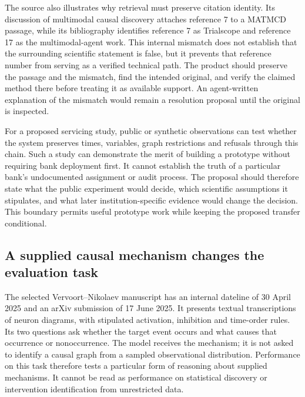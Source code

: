 The source also illustrates why retrieval must preserve citation identity.
Its discussion of multimodal causal discovery attaches reference 7 to a
MATMCD passage, while its bibliography identifies reference 7 as Trialscope
and reference 17 as the multimodal-agent work. This internal mismatch does
not establish that the surrounding scientific statement is false, but it
prevents that reference number from serving as a verified technical path.
The product should preserve the passage and the mismatch, find the intended
original, and verify the claimed method there before treating it as available
support. An agent-written explanation of the mismatch would remain a
resolution proposal until the original is inspected.~\citep{exec18_reasoning_biomedical}

For a proposed servicing study, public or synthetic observations can test
whether the system preserves times, variables, graph restrictions and refusals
through this chain. Such a study can demonstrate the merit of building a
prototype without requiring bank deployment first. It cannot establish the
truth of a particular bank's undocumented assignment or audit process. The
proposal should therefore state what the public experiment would decide,
which scientific assumptions it stipulates, and what later institution-specific
evidence would change the decision. This boundary permits useful prototype
work while keeping the proposed transfer conditional.

\subsection{A supplied causal mechanism changes the evaluation task}
The selected Vervoort--Nikolaev manuscript has an internal dateline of
30 April 2025 and an arXiv submission of 17 June 2025. It presents textual
transcriptions of neuron diagrams, with stipulated activation, inhibition
and time-order rules. Its two questions ask whether the target event occurs
and what causes that occurrence or nonoccurrence. The model receives the
mechanism; it is not asked to identify a causal graph from a sampled
observational distribution. Performance on this task therefore tests a
particular form of reasoning about supplied mechanisms. It cannot be read as
performance on statistical discovery or intervention identification from
unrestricted data.~\citep{exec18_reasoning_neuron}

